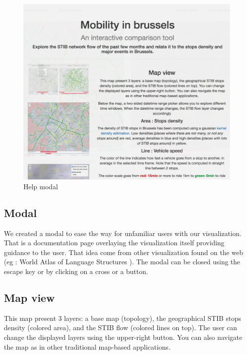 \documentclass[11pt]{article}%
\begin{document}
\begin{minipage}{0.4\textwidth}
  \begin{figure}[H]
    \includegraphics[width=\textwidth]{images/modal.png}
    \caption{Help modal}
  \end{figure}
\end{minipage}\hfill
\begin{minipage}{0.58\textwidth}
  \subsection{Modal}
  We created a modal to ease the way for unfamiliar users with our visualization. That is a documentation page overlaying the visualization itself providing guidance to the user. That idea come from other visualization found on the web (eg : World Atlas of Language Structures \cite{visuawithmodal}). The modal can be closed using the escape key or by clicking on a cross or a button.
\end{minipage}


\subsection{Map view}

This map present 3 layers: a base map (topology), the geographical STIB stops density (colored area), and the STIB flow (colored lines on top). The user can change the displayed layers using the upper-right button. You can also navigate the map as in other traditional map-based applications.
\end{document}
